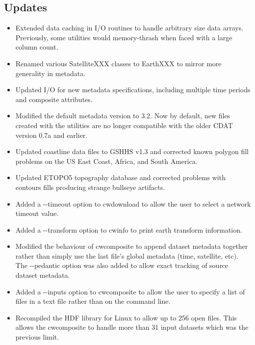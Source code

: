 \subsection*{Updates}
\begin{itemize}

  \item Extended data caching in I/O routines to handle arbitrary size
  data arrays. Previously, some utilities would memory-thrash when
  faced with a large column count.

  \item Renamed various SatelliteXXX classes to EarthXXX to mirror
  more generality in metadata.

  \item Updated I/O for new metadata specifications, including
  multiple time periods and composite attributes.

  \item Modified the default metadata version to 3.2. Now by default,
  new files created with the utilities are no longer compatible with
  the older CDAT version 0.7a and earlier.

  \item Updated coastline data files to GSHHS v1.3 and corrected known
  polygon fill problems on the US East Coast, Africa, and South
  America.

  \item Updated ETOPO5 topography database and corrected problems with
  contours fills producing strange bullseye artifacts.

  \item Added a -{-}timeout option to cwdownload to allow the user to
  select a network timeout value.

  \item Added a -{-}transform option to cwinfo to print earth transform
  information.

  \item Modified the behaviour of cwcomposite to append dataset
  metadata together rather than simply use the last file's global
  metadata (time, satellite, etc). The -{-}pedantic option was also
  added to allow exact tracking of source dataset metadata.

  \item Added a -{-}inputs option to cwcomposite to allow the user to
  specify a list of files in a text file rather than on the command
  line.

  \item Recompiled the HDF library for Linux to allow up to 256 open
  files. This allows the cwcomposite to handle more than 31 input
  datasets which was the previous limit.


\end{itemize}
